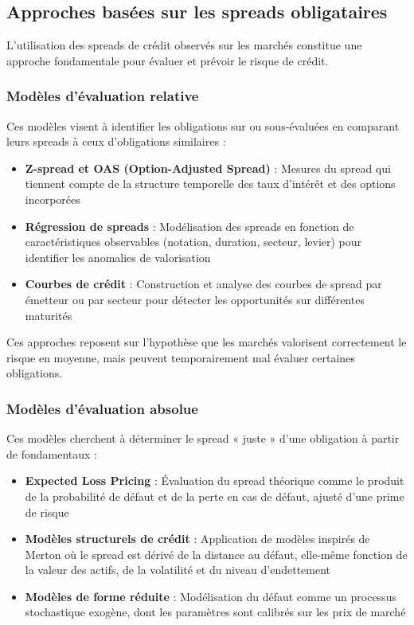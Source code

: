 \subsection{Approches basées sur les spreads obligataires}

L'utilisation des spreads de crédit observés sur les marchés constitue une approche fondamentale pour évaluer et prévoir le risque de crédit.

\subsubsection{Modèles d'évaluation relative}

Ces modèles visent à identifier les obligations sur ou sous-évaluées en comparant leurs spreads à ceux d'obligations similaires :

\begin{itemize}
    \item \textbf{Z-spread et OAS (Option-Adjusted Spread)} : Mesures du spread qui tiennent compte de la structure temporelle des taux d'intérêt et des options incorporées
    
    \item \textbf{Régression de spreads} : Modélisation des spreads en fonction de caractéristiques observables (notation, duration, secteur, levier) pour identifier les anomalies de valorisation
    
    \item \textbf{Courbes de crédit} : Construction et analyse des courbes de spread par émetteur ou par secteur pour détecter les opportunités sur différentes maturités
\end{itemize}

Ces approches reposent sur l'hypothèse que les marchés valorisent correctement le risque en moyenne, mais peuvent temporairement mal évaluer certaines obligations.

\subsubsection{Modèles d'évaluation absolue}

Ces modèles cherchent à déterminer le spread « juste » d'une obligation à partir de fondamentaux :

\begin{itemize}
    \item \textbf{Expected Loss Pricing} : Évaluation du spread théorique comme le produit de la probabilité de défaut et de la perte en cas de défaut, ajusté d'une prime de risque
    
    \item \textbf{Modèles structurels de crédit} : Application de modèles inspirés de Merton où le spread est dérivé de la distance au défaut, elle-même fonction de la valeur des actifs, de la volatilité et du niveau d'endettement
    
    \item \textbf{Modèles de forme réduite} : Modélisation du défaut comme un processus stochastique exogène, dont les paramètres sont calibrés sur les prix de marché
\end{itemize}

